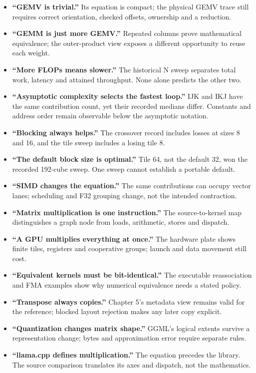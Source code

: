 \documentclass[
  10pt,
]{article}
\providecommand{\tightlist}{%
  \setlength{\itemsep}{0pt}\setlength{\parskip}{0pt}}
\begin{document}
\begin{itemize}
\tightlist
\item
  \textbf{``GEMV is trivial.''} Its equation is compact; the physical
  GEMV trace still requires correct orientation, checked offsets,
  ownership and a reduction.
\item
  \textbf{``GEMM is just more GEMV.''} Repeated columns prove
  mathematical equivalence; the outer-product view exposes a different
  opportunity to reuse each weight.
\item
  \textbf{``More FLOPs means slower.''} The historical N sweep separates
  total work, latency and attained throughput. None alone predicts the
  other two.
\item
  \textbf{``Asymptotic complexity selects the fastest loop.''} IJK and
  IKJ have the same contribution count, yet their recorded medians
  differ. Constants and address order remain observable below the
  asymptotic notation.
\item
  \textbf{``Blocking always helps.''} The crossover record includes
  losses at sizes 8 and 16, and the tile sweep includes a losing tile 8.
\item
  \textbf{``The default block size is optimal.''} Tile 64, not the
  default 32, won the recorded 192-cube sweep. One sweep cannot
  establish a portable default.
\item
  \textbf{``SIMD changes the equation.''} The same contributions can
  occupy vector lanes; scheduling and F32 grouping change, not the
  intended contraction.
\item
  \textbf{``Matrix multiplication is one instruction.''} The
  source-to-kernel map distinguishes a graph node from loads,
  arithmetic, stores and dispatch.
\item
  \textbf{``A GPU multiplies everything at once.''} The hardware plate
  shows finite tiles, registers and cooperative groups; launch and data
  movement still cost.
\item
  \textbf{``Equivalent kernels must be bit-identical.''} The executable
  reassociation and FMA examples show why numerical equivalence needs a
  stated policy.
\item
  \textbf{``Transpose always copies.''} Chapter 5's metadata view
  remains valid for the reference; blocked layout rejection makes any
  later copy explicit.
\item
  \textbf{``Quantization changes matrix shape.''} GGML's logical extents
  survive a representation change; bytes and approximation error require
  separate rules.
\item
  \textbf{``llama.cpp defines multiplication.''} The equation precedes
  the library. The source comparison translates its axes and dispatch,
  not the mathematics.
\end{itemize}
\end{document}
